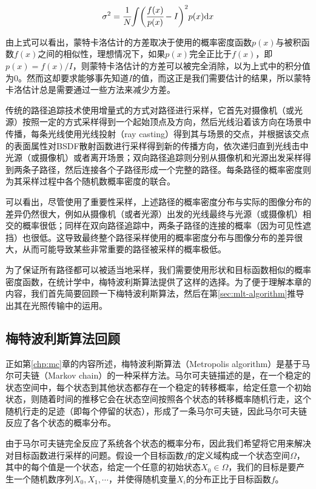 \begin{equation}
	\sigma^{2}= \cfrac{1}{N}{\rm \int} \bigg( \cfrac{f(x)}{p(x)}-I\bigg)^{2}p(x){\rm d}x
\end{equation}

由上式可以看出，蒙特卡洛估计的方差取决于使用的概率密度函数$p(x)$与被积函数$f(x)$之间的相似性，理想情况下，如果$p(x)$完全正比于$f(x)$，即$p(x)=f(x)/I$，则蒙特卡洛估计的方差可以被完全消除，以为上式中的积分值为0。然而这却要求能够事先知道$I$的值，而这正是我们需要估计的结果，所以蒙特卡洛估计总是需要通过一些方法来减少方差。

传统的路径追踪技术使用增量式的方式对路径进行采样，它首先对摄像机（或光源）按照一定的方式采样得到一个起始顶点及方向，然后光线沿着该方向在场景中传播，每条光线使用光线投射（ray casting）得到其与场景的交点，并根据该交点的表面属性对BSDF散射函数进行采样得到新的传播方向，依次递归直到光线击中光源（或摄像机）或者离开场景；双向路径追踪则分别从摄像机和光源出发采样得到两条子路径，然后连接各个子路径形成一个完整的路径。每条路径的概率密度则为其采样过程中各个随机数概率密度的联合。

可以看出，尽管使用了重要性采样，上述路径的概率密度分布与实际的图像分布的差异仍然很大，例如从摄像机（或者光源）出发的光线最终与光源（或摄像机）相交的概率很低；同样在双向路径追踪中，两条子路径的连接的概率（因为可见性遮挡）也很低。这导致最终整个路径采样使用的概率密度分布与图像分布的差异很大，从而可能导致某些非常重要的路径被采样的概率极低。

为了保证所有路径都可以被适当地采样，我们需要使用形状和目标函数相似的概率密度函数，在统计学中，梅特波利斯算法提供了这样的选择。为了便于理解本章的内容，我们首先简要回顾一下梅特波利斯算法，然后在第\ref{sec:mlt-algorithm}推导出其在光照传输中的运用。



\subsection{梅特波利斯算法回顾}
正如第\ref{chp:mc}章的内容所述，梅特波利斯算法（Metropolis algorithm）是基于马尔可夫链（Markov chain）的一种采样方法。马尔可夫链描述的是，在一个稳定的状态空间中，每个状态到其他状态都存在一个稳定的转移概率，给定任意一个初始状态，则随着时间的推移它会在状态空间按照各个状态的转移概率随机行走，这个随机行走的足迹（即每个停留的状态），形成了一条马尔可夫链，因此马尔可夫链反应了各个状态的概率分布。

由于马尔可夫链完全反应了系统各个状态的概率分布，因此我们希望将它用来解决对目标函数进行采样的问题。假设一个目标函数$f$的定义域构成一个状态空间$\Omega$，其中的每个值是一个状态，给定一个任意的初始状态$X_0\in\Omega$，我们的目标是要产生一个随机数序列$X_0,{X}_1,\cdots$，并使得随机变量${X}_i$的分布正比于目标函数$f$。


